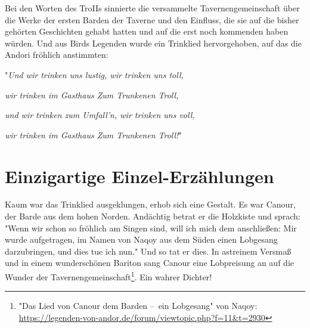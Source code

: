 Bei den Worten des TroIIs sinnierte die versammelte Tavernengemeinschaft über die Werke der ersten Barden der Taverne und den Einfluss, die sie auf die bisher gehörten Geschichten gehabt hatten und auf die erst noch kommenden haben würden. Und aus Birds Legenden wurde ein Trinklied hervorgehoben, auf das die Andori fröhlich anstimmten:

"\textit{Und wir trinken uns lustig, wir trinken uns toll,}

\textit{wir trinken im Gasthaus Zum Trunkenen Troll,}

\textit{und wir trinken zum Umfall'n, wir trinken uns voll,}

\textit{wir trinken im Gasthaus Zum Trunkenen Troll!}"




\newpage
\section{Einzigartige Einzel-Erzählungen}




Kaum war das Trinklied ausgeklungen, erhob sich eine Gestalt. Es war Canour, der Barde aus dem hohen Norden. Andächtig betrat er die Holzkiste und sprach: "Wenn wir schon so fröhlich am Singen sind, will ich mich dem anschließen: Mir wurde aufgetragen, im Namen von Naqoy aus dem Süden einen Lobgesang darzubringen, und dies tue ich nun." Und so tat er dies. In astreinem Versmaß und in einem wunderschönen Bariton sang Canour eine Lobpreisung an auf die Wunder der Tavernengemeinschaft\footnote{"Das Lied von Canour dem Barden – ein Lobgesang" von Naqoy: \url{https://legenden-von-andor.de/forum/viewtopic.php?f=11&t=2930}}. Ein wahrer Dichter!

